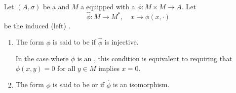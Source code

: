 
\begin{definition} \label{definition:nondegenerate_nonsingular_regular_sesquilinear_form_on_a_module_over_an_involution_ring}
Let $(A, \sigma)$ be a  and $M$ a  equipped with a  $\phi: M \times M \to A$.
Let 
$$\hat{\phi}: M \to M^*, \quad x \mapsto \phi(x, \cdot)$$
be the induced (left) .
\begin{enumerate}
    \item The form $\phi$ is said to be  if $\hat{\phi}$ is injective.

    In the case where $\phi$ is an , this condition is equivalent to requiring that $\phi(x, y) = 0$ for all $y \in M$ implies $x = 0$.

    \item The form $\phi$ is said to be  or  if $\hat{\phi}$ is an isomorphism.
\end{enumerate}
\end{definition}

